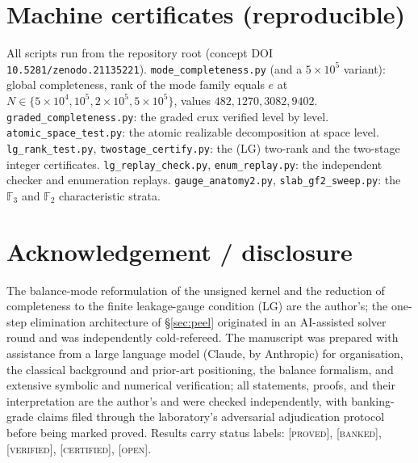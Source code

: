 \documentclass[11pt,reqno]{amsart}
\theoremstyle{plain}
\theoremstyle{definition}
\theoremstyle{plain}
\theoremstyle{definition}
\newcommand{\F}{\mathbb{F}}
\newcommand{\st}{\textsc}
\begin{document}
\appendix
\section{Machine certificates (reproducible)}
All scripts run from the repository root (concept DOI \texttt{10.5281/zenodo.21135221}).
\texttt{mode\_completeness.py} (and a $5\times10^5$ variant): global completeness, rank of the
mode family equals $e$ at $N\in\{5\times10^4,10^5,2\times10^5,5\times10^5\}$, values
$482,1270,3082,9402$. \texttt{graded\_completeness.py}: the graded crux verified level by level.
\texttt{atomic\_space\_test.py}: the atomic realizable decomposition at space level.
\texttt{lg\_rank\_test.py}, \texttt{twostage\_certify.py}: the (LG) two-rank and the two-stage
integer certificates. \texttt{lg\_replay\_check.py}, \texttt{enum\_replay.py}: the independent
checker and enumeration replays. \texttt{gauge\_anatomy2.py}, \texttt{slab\_gf2\_sweep.py}: the
$\F_3$ and $\F_2$ characteristic strata.

\section*{Acknowledgement / disclosure}
The balance-mode reformulation of the unsigned kernel and the reduction of completeness to the
finite leakage-gauge condition (LG) are the author's; the one-step elimination architecture of
\S\ref{sec:peel} originated in an AI-assisted solver round and was independently cold-refereed.
The manuscript was prepared with assistance from a large language model (Claude, by Anthropic)
for organisation, the classical background and prior-art positioning, the balance formalism, and
extensive symbolic and numerical verification; all statements, proofs, and their interpretation
are the author's and were checked independently, with banking-grade claims filed through the
laboratory's adversarial adjudication protocol before being marked proved. Results carry status
labels: \st{[proved]}, \st{[banked]}, \st{[verified]}, \st{[certified]}, \st{[open]}.
\end{document}
